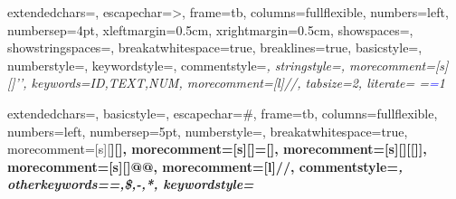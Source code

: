 %
{%
		extendedchars=\true,
		escapechar=>, %
		frame=tb, %
    columns=fullflexible,
		numbers=left, %
    numbersep=4pt, %
		xleftmargin=0.5cm,
		xrightmargin=0.5cm,
		showspaces=\false,
		showstringspaces=\false,
		breakatwhitespace=true,         %
		breaklines=true,                 %
		basicstyle=\color{black}\small\sffamily,
    numberstyle=\footnotesize\color{gray}, %
    keywordstyle={\color{black}\bfseries},
		commentstyle=\color{gray}\itshape, %
		stringstyle=\color{orange}, %
    morecomment=[s][\color{blue}]{'}{'},
		keywords={ID,TEXT,NUM},%
    morecomment=[l]{//},
		tabsize=2,
		literate=
		{=}{\textcolor{blue}{=}\bfseries}1%
}

%
{%
		extendedchars=\true,
    basicstyle=\sffamily\small,
		escapechar=\#, %
		frame=tb, %
    columns=fullflexible,
		numbers=left, %
    numbersep=5pt,%
    numberstyle=\small\color{gray}, %
		breakatwhitespace=true,         %
    morecomment=[s][\color{black}\bfseries]{[}{]},
    morecomment=[s][\color{purple}\bfseries]{=[}{]},
    morecomment=[s][\color{pink}\bfseries]{[[}{]]},
    morecomment=[s][\color{blue}\bfseries]{@}{@},
    morecomment=[l]{//},
    commentstyle=\color{gray}\itshape,
    otherkeywords={=,\$,-,*},
    keywordstyle={\color{brown}\bfseries}
}

